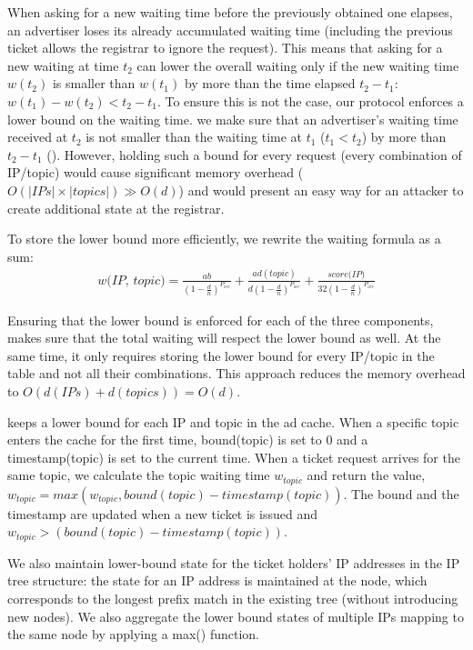 When asking for a new waiting time before the previously obtained one elapses,
an advertiser loses its already accumulated waiting time (including the previous ticket allows the registrar to ignore the request). This means that asking for a new waiting at time $t_2$ can lower the overall waiting only if
the new waiting time $w(t_2)$ is smaller than $w(t_1)$ by more than the time elapsed $t_2 - t_1$: $w(t_1) - w(t_2) < t_2 - t_1$.
To ensure this is not the case, our protocol enforces a lower bound on the
waiting time. \Ie we make sure that an advertiser's waiting time received at
$t_2$ is not smaller than the waiting time at $t_1$ ($t_1 < t_2$) by more than
$t_2 - t_1$ ().
However, holding such a bound for every request (\ie every combination of IP/topic) would cause significant memory overhead ($O(|IPs|\times|topics|) \gg O(d)$) and would present an easy way for an attacker to create additional state at the registrar. 

To store the lower bound more efficiently, we rewrite the waiting formula as a sum:
\begin{equation}
\begin{split}
    \textit{w(IP, topic)} = 
    \frac{ab}{(1-\frac{d}{n})^{P_\textit{occ}}} + \frac{ad(topic)}{d(1-\frac{d}{n})^{P_\textit{occ}}} + \frac{\textit{score(IP)}}{32(1-\frac{d}{n})^{P_\textit{occ}}}
\end{split}
\end{equation}


Ensuring that the lower bound is enforced for each of the three components, makes sure that the total waiting will respect the lower bound as well. At the same time, it only requires storing the lower bound for every IP/topic in the table and not all their combinations. This approach reduces the memory overhead to $O(d(IPs)+d(topics)) = O(d)$.

\sysname keeps a lower bound for each IP and topic in the ad cache. When a specific topic enters the cache for the first time, bound(topic) is set to 0 and a timestamp(topic) is set to the current time. When a ticket request arrives for the same topic, we calculate the topic waiting time $w_{\textit{topic}}$ and return the value, $w_{\textit{topic}} = \textit{max}(w_{\textit{topic}}, \textit{bound}(\textit{topic}) - \textit{timestamp}(\textit{topic}))$. The bound and the timestamp are updated when a new ticket is issued and $w_{\textit{topic}} > (\textit{bound}(\textit{topic}) - \textit{timestamp}(\textit{topic}))$. 

We also maintain lower-bound state for the ticket holders' IP addresses in the IP tree structure: the state for an IP address is maintained at the node, which corresponds to the longest prefix match in the existing tree (without introducing new nodes). We also aggregate the lower bound states of multiple IPs mapping to the same node by applying a max() function.  


